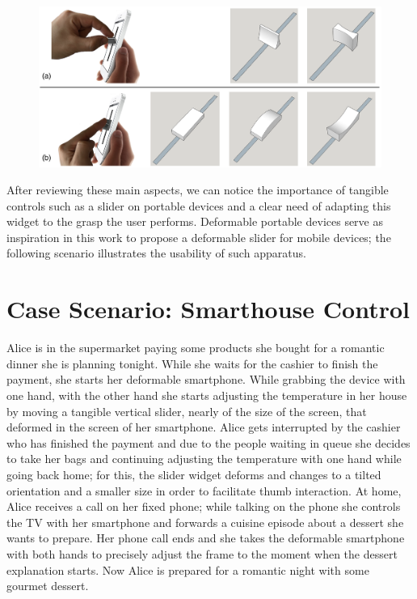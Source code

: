 \documentclass{sigchi}
\begin{document}
\begin{figure}[h]
\centering
  \includegraphics[width=0.9\columnwidth]{figures/2}
  \caption{}
  \label{fig:figure2}
\end{figure}

After reviewing these main aspects, we can notice the importance of tangible controls such as a slider on portable devices and a clear need of adapting this widget to the grasp the user performs. Deformable portable devices \cite{unpublished,Hemmert:2008:DKS:1358628.1358675,Roudaut:2013:MTH:2470654.2470738,Dimitriadis:2014:EEP:2556288.2557164} serve as inspiration in this work to propose a deformable slider for mobile devices; the following scenario illustrates the usability of such apparatus.

\section{Case Scenario: Smarthouse Control}
Alice is in the supermarket paying some products she bought for a romantic dinner she is planning tonight. While she waits for the cashier to finish the payment, she starts her deformable smartphone. While grabbing the device with one hand, with the other hand she starts adjusting the temperature in her house by moving a tangible vertical slider, nearly of the size of the screen, that deformed in the screen of her smartphone. Alice gets interrupted by the cashier who has finished the payment and due to the people waiting in queue she decides to take her bags and continuing adjusting the temperature with one hand while going back home; for this, the slider widget deforms and changes to a tilted orientation and a smaller size in order to facilitate thumb interaction. At home, Alice receives a call on her fixed phone; while talking on the phone she controls the TV with her smartphone and forwards a cuisine episode about a dessert she wants to prepare. Her phone call ends and she takes the deformable smartphone with both hands to precisely adjust the frame to the moment when the dessert explanation starts. Now Alice is prepared for a romantic night with some gourmet dessert.
\end{document}
